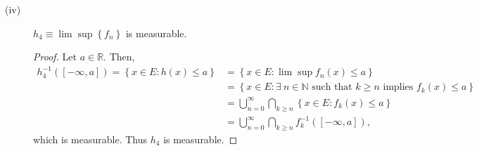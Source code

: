 \documentclass[12pt]{article}
\begin{document}
\begin{description}
\item[(iv)] $h_{4} \equiv \lim\sup\left\{ f_{n} \right\}$ is measurable.

\begin{proof}
Let $a \in \mathbb{R}$. Then,
\begin{align*}
h_{4}^{-1}\left( [-\infty,a] \right) = \left\{ x \in E : h(x) \leq a \right\} & = \left\{ x \in E : \lim\sup f_{n}(x) \leq a \right\} \\
& = \left\{ x \in E : \exists\ n \in \mathbb{N} \text{ such that } k \geq n \text{ implies } f_{k}(x) \leq a \right\} \\
& = \bigcup_{n=0}^{\infty}\bigcap_{k\geq n} \left\{ x \in E : f_{k}(x) \leq a \right\} \\
& = \bigcup_{n=0}^{\infty}\bigcap_{k\geq n} f_{k}^{-1}\left( [-\infty, a] \right),
\end{align*}
which is measurable. Thus $h_{4}$ is measurable.
\end{proof}
\end{description}
\end{document}
